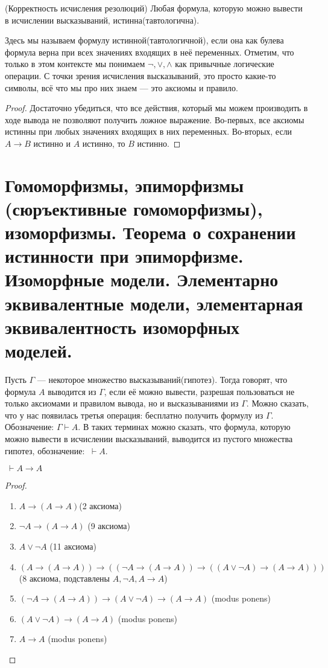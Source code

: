 \documentclass{article}
\begin{document}
\begin{theorem}{(Корректность исчисления резолюций)}
	Любая формула, которую можно вывести в исчислении высказываний, истинна(тавтологична).
\end{theorem}
Здесь мы называем формулу истинной(тавтологичной), если она как булева формула верна при всех значениях входящих в неё переменных. Отметим, что только в этом контексте мы понимаем $\lnot, \lor, \land$ как привычные логические операции. С точки зрения исчисления высказываний, это просто какие-то символы, всё что мы про них знаем --- это аксиомы и правило.
\begin{proof}
	Достаточно убедиться, что все действия, который мы можем производить в ходе вывода не позволяют получить ложное выражение. Во-первых, все аксиомы истинны при любых значениях входящих в них переменных. Во-вторых, если $A \to B$ истинно и $A$ истинно, то $B$ истинно.
\end{proof}

\section{Гомоморфизмы, эпиморфизмы (сюръективные гомоморфизмы), изоморфизмы. Теорема о сохранении истинности при эпиморфизме. Изоморфные модели. Элементарно эквивалентные модели, элементарная эквивалентность изоморфных моделей.}
Пусть $\Gamma$ --- некоторое множество высказываний(гипотез). Тогда говорят, что формула $A$ выводится из $\Gamma$, если её можно вывести,  разрешая пользоваться не только аксиомами и правилом вывода, но и высказываниями из $\Gamma$. Можно сказать, что у нас появилась третья операция: бесплатно получить формулу из $\Gamma$. Обозначение: $\Gamma \vdash A$. В таких терминах можно сказать, что формула, которую можно вывести в исчислении высказываний,  выводится из пустого множества гипотез, обозначение: $\ \vdash A$.

\begin{lemma}
	$\ \vdash A \to A$
\end{lemma}

\begin{proof}
	\begin{enumerate}
		\item $A \to (A \to A)$(2 аксиома)
		\item $\lnot A \to (A \to A)$ (9 аксиома)
		\item $A \lor \lnot A$ (11 аксиома)
		\item $(A \to (A \to A)) \to ((\lnot A \to (A \to A)) \to ((A \lor \lnot A) \to (A \to A)))$ (8 аксиома, подставлены $A, \lnot A, A \to A$)
		\item $(\lnot A \to (A \to A)) \to (A \lor \lnot A) \to (A \to A)$ (modus ponens)
		\item $(A \lor \lnot A) \to (A \to A)$ (modus ponens)
		\item $A \to A$ (modus ponens)
	\end{enumerate}
\end{proof}
\end{document}
